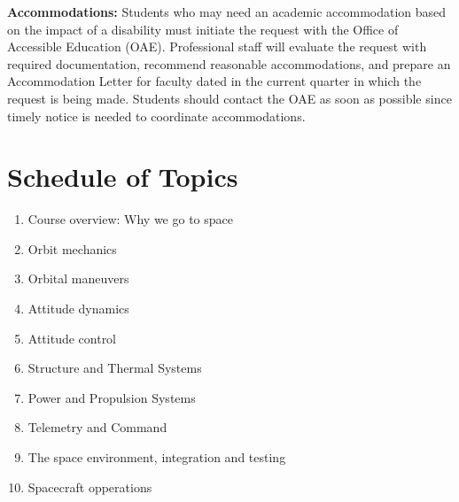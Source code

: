 \documentclass[11pt,letterpaper]{article}
\begin{document}
\medskip
\noindent
\textbf{Accommodations:} Students who may need an academic accommodation based on the impact of a disability must initiate the request with the Office of Accessible Education (OAE). Professional staff will evaluate the request with required documentation, recommend reasonable accommodations, and prepare an Accommodation Letter for faculty dated in the current quarter in which the request is being made. Students should contact the OAE as soon as possible since timely notice is needed to coordinate accommodations.


\section*{Schedule of Topics}

\begin{enumerate}[label=\textbf{Week \arabic*:},leftmargin=3.5\parindent]
	\item Course overview: Why we go to space
	\item Orbit mechanics
	\item Orbital maneuvers
	\item Attitude dynamics
	\item Attitude control
	\item Structure and Thermal Systems
	\item Power and Propulsion Systems
	\item Telemetry and Command
	\item The space environment, integration and testing
	\item Spacecraft opperations
\end{enumerate}
\end{document}
